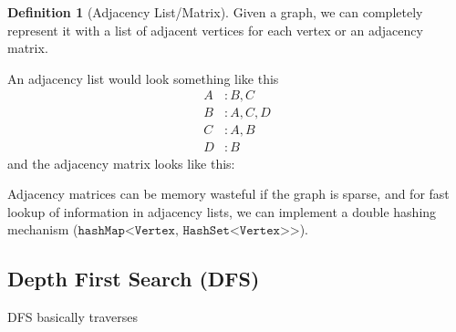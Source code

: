 \documentclass{article}
\theoremstyle{definition}
\theoremstyle{remark}
\theoremstyle{definition}
\newtheorem{definition}{Definition}[section]
\begin{document}
\begin{definition}[Adjacency List/Matrix]
Given a graph, we can completely represent it with a list of adjacent vertices for each vertex or an adjacency matrix. 
\begin{center}
\end{center}
An adjacency list would look something like this 
\[
\begin{aligned}
A &: B, C \\
B &: A, C, D \\
C &: A, B \\
D &: B
\end{aligned}
\]
and the adjacency matrix looks like this: 
\begin{center}
\end{center}
Adjacency matrices can be memory wasteful if the graph is sparse, and for fast lookup of information in adjacency lists, we can implement a double hashing mechanism ($\texttt{hashMap<Vertex, HashSet<Vertex>>}$). 
\end{definition}

\subsection{Depth First Search (DFS)}

DFS basically traverses 
\end{document}
